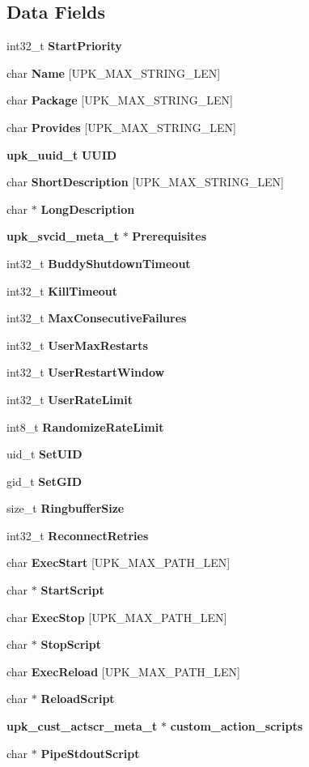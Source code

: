 \subsection*{Data Fields}
\begin{DoxyCompactItemize}
\item 
int32\_\-t {\bf StartPriority}
\item 
char {\bf Name} [UPK\_\-MAX\_\-STRING\_\-LEN]
\item 
char {\bf Package} [UPK\_\-MAX\_\-STRING\_\-LEN]
\item 
char {\bf Provides} [UPK\_\-MAX\_\-STRING\_\-LEN]
\item 
{\bf upk\_\-uuid\_\-t} {\bf UUID}
\item 
char {\bf ShortDescription} [UPK\_\-MAX\_\-STRING\_\-LEN]
\item 
char $\ast$ {\bf LongDescription}
\item 
{\bf upk\_\-svcid\_\-meta\_\-t} $\ast$ {\bf Prerequisites}
\item 
int32\_\-t {\bf BuddyShutdownTimeout}
\item 
int32\_\-t {\bf KillTimeout}
\item 
int32\_\-t {\bf MaxConsecutiveFailures}
\item 
int32\_\-t {\bf UserMaxRestarts}
\item 
int32\_\-t {\bf UserRestartWindow}
\item 
int32\_\-t {\bf UserRateLimit}
\item 
int8\_\-t {\bf RandomizeRateLimit}
\item 
uid\_\-t {\bf SetUID}
\item 
gid\_\-t {\bf SetGID}
\item 
size\_\-t {\bf RingbufferSize}
\item 
int32\_\-t {\bf ReconnectRetries}
\item 
char {\bf ExecStart} [UPK\_\-MAX\_\-PATH\_\-LEN]
\item 
char $\ast$ {\bf StartScript}
\item 
char {\bf ExecStop} [UPK\_\-MAX\_\-PATH\_\-LEN]
\item 
char $\ast$ {\bf StopScript}
\item 
char {\bf ExecReload} [UPK\_\-MAX\_\-PATH\_\-LEN]
\item 
char $\ast$ {\bf ReloadScript}
\item 
{\bf upk\_\-cust\_\-actscr\_\-meta\_\-t} $\ast$ {\bf custom\_\-action\_\-scripts}
\item 
char $\ast$ {\bf PipeStdoutScript}
\item 

\end{DoxyCompactItemize}
